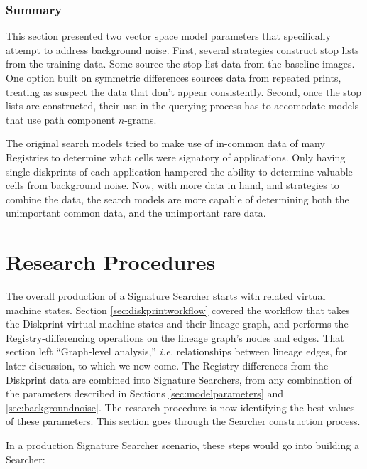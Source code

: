 \documentclass[11pt]{ucthesis}
\theoremstyle{plain}
\theoremstyle{definition}
\newcommand{\ie}{\emph{i.e.}\xspace}
\begin{document}
\subsubsection{Summary}

This section presented two vector space model parameters that specifically attempt to address background noise.  First, several strategies construct stop lists from the training data.  Some source the stop list data from the baseline images.  One option built on symmetric differences sources data from repeated prints, treating as suspect the data that don't appear consistently.  Second, once the stop lists are constructed, their use in the querying process has to accomodate models that use path component $n$-grams.

The original search models \cite{nelson:aafs14} tried to make use of in-common data of many Registries to determine what cells were signatory of applications.  Only having single diskprints of each application hampered the ability to determine valuable cells from background noise.  Now, with more data in hand, and strategies to combine the data, the search models are more capable of determining both the unimportant common data, and the unimportant rare data.


\section{Research Procedures}

The overall production of a Signature Searcher starts with related virtual machine states.  Section \ref{sec:diskprintworkflow} covered the workflow that takes the Diskprint virtual machine states and their lineage graph, and performs the Registry-differencing operations on the lineage graph's nodes and edges.  That section left ``Graph-level analysis,'' \ie relationships between lineage edges, for later discussion, to which we now come.  The Registry differences from the Diskprint data are combined into Signature Searchers, from any combination of the parameters described in Sections \ref{sec:modelparameters} and \ref{sec:backgroundnoise}.  The research procedure is now identifying the best values of these parameters.  This section goes through the Searcher construction process.

In a production Signature Searcher scenario, these steps would go into building a Searcher:
\end{document}
